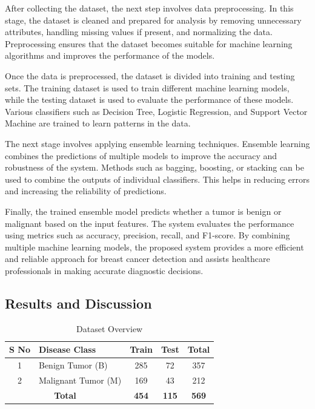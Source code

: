 \documentclass[12pt]{article}
\begin{document}
After collecting the dataset, the next step involves data preprocessing. In this stage, the dataset is cleaned and prepared for analysis by removing unnecessary attributes, handling missing values if present, and normalizing the data. Preprocessing ensures that the dataset becomes suitable for machine learning algorithms and improves the performance of the models.

Once the data is preprocessed, the dataset is divided into training and testing sets. The training dataset is used to train different machine learning models, while the testing dataset is used to evaluate the performance of these models. Various classifiers such as Decision Tree, Logistic Regression, and Support Vector Machine are trained to learn patterns in the data.

The next stage involves applying ensemble learning techniques. Ensemble learning combines the predictions of multiple models to improve the accuracy and robustness of the system. Methods such as bagging, boosting, or stacking can be used to combine the outputs of individual classifiers. This helps in reducing errors and increasing the reliability of predictions.

Finally, the trained ensemble model predicts whether a tumor is benign or malignant based on the input features. The system evaluates the performance using metrics such as accuracy, precision, recall, and F1-score. By combining multiple machine learning models, the proposed system provides a more efficient and reliable approach for breast cancer detection and assists healthcare professionals in making accurate diagnostic decisions.

\subsection{Results and Discussion}

\begin{table}[H]
\centering
\caption{Dataset Overview}
\label{tab:dataset}
\begin{tabular}{clccc}
\toprule
\textbf{S No} & \textbf{Disease Class} & \textbf{Train} & \textbf{Test} & \textbf{Total} \\ 
\midrule
1 & Benign Tumor (B) & 285 & 72 & 357 \\
2 & Malignant Tumor (M) & 169 & 43 & 212 \\
\midrule
\multicolumn{2}{c}{\textbf{Total}} & \textbf{454} & \textbf{115} & \textbf{569} \\
\bottomrule
\end{tabular}
\end{table}
\end{document}
